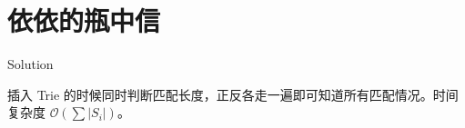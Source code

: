 \section{依依的瓶中信}

\begin{frame}{Solution}

插入 Trie 的时候同时判断匹配长度，正反各走一遍即可知道所有匹配情况。时间复杂度 $\mathcal O(\sum |S_i|)$。

\end{frame}